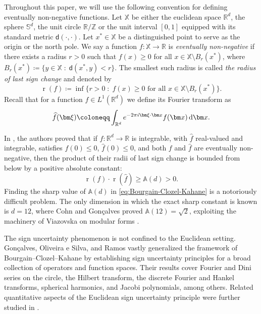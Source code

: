 \documentclass[reqno, a4paper]{amsart}
\def\R{\mathbb{R}}
\def\T{\mathbb{R}/\mathbb{Z}}
\def\X{\mathbb{X}}
\renewcommand{\d}{\text{\rm d}}
\newcommand{\Sd}{\mathbb{S}^d}
\newcommand{\x}{{\bm x}}
\newcommand{\xxi}{{\bm \xi}}
\renewcommand{\r}{\operatorname{r}}
\theoremstyle{plain}
\theoremstyle{definition}
\theoremstyle{remarkstyle}
\numberwithin{equation}{section}
\begin{document}
Throughout this paper, we will use the following convention for defining eventually non-negative functions. Let $\mathbb{X}$ be either the euclidean space $\R^d$, the sphere $\Sd$, the unit circle $\T$ or the unit interval $[0, 1]$ 
equipped with its standard metric $\mathbf{\mathsf{d}}(\cdot, \cdot)$. Let $x^\ast\in \X$ be a distinguished point to serve as the origin or the north pole. We say a function $f:\X \to \R$ is \emph{eventually non-negative} if there exists a radius $r>0$ such that $f(x)\geq 0$ for all $x\in \X\setminus B_r(x^\ast)$, where $B_r(x^\ast)\coloneqq\bigl\{y\in \X \; :\; \mathbf{\mathsf{d}}(x^\ast, y)<r  \bigr\}$. The smallest such radius is called \emph{the radius of last sign change} and denoted by 
\begin{equation}\label{eq:definition-of-r-of-f}
    \r(f)\coloneqq \inf\bigl\{r>0 \; :\; f(x)\geq 0 \text{ for all } x\in \X\setminus B_r(x^\ast)  \bigr\}.
\end{equation}
Recall that for a function $f\in L^1(\R^d)$ we define its Fourier transform as 
\begin{equation*}
    \widehat{f}(\xxi)\coloneqq\int_{\R^d} e^{-2\pi i \xxi\cdot \x} f(\x)\,\d \x.
\end{equation*}

\smallskip
In \cite{Bourgain2010PrincipeDHeisenbergFonctionsPositives}, the authors proved that if $f:\R^d\to\R$ is integrable, with $\widehat{f}$ real-valued and integrable, satisfies
$f(0)\leq 0$, $\widehat{f}(0)\leq 0$, and both $f$ and $\widehat{f}$ are eventually
non-negative, then the product of their radii of last sign change is bounded from below by a positive
absolute constant:
\begin{equation}\label{eq:Bourgain-Clozel-Kahane}
  \r(f)\cdot \r(\widehat{f}) \geq \mathbb{A}(d) > 0.
\end{equation}
Finding the sharp value of $\mathbb{A}(d)$ in \eqref{eq:Bourgain-Clozel-Kahane} is a notoriously difficult problem. The only dimension in which the exact sharp constant is known is $d=12$, where Cohn and Gonçalves \cite{CohnGoncalves2019-AnOptimalUncertaintyPrinciple} proved $\mathbb{A}(12)=\sqrt{2}$, exploiting the machinery of Viazovska on modular forms  \cite{Viazovska2017-TheSpherePackingProblemInDimension8}.

\smallskip

The sign uncertainty phenomenon is not confined to the Euclidean setting. Gon\c{c}alves, Oliveira e Silva, and Ramos \cite{Goncalves2023NewSignUncertaintyPrinciples} vastly generalized the framework of Bourgain--Clozel--Kahane by establishing sign uncertainty principles for a broad collection of operators and function spaces. Their results cover Fourier and Dini series on the circle, the Hilbert transform, the discrete Fourier and Hankel transforms, spherical harmonics, and Jacobi polynomials, among others. Related quantitative aspects of the Euclidean sign uncertainty principle were further studied in \cite{CarneiroQuesada-Herrera2023GeneralizedSign,GoncalvesOliveiraESilvaRamos2021-OnRegularityAndMass, GoncalvesOliveira-e-SilvaSteinerberger-HermitePolynomialsLinearFlows}.
\end{document}
